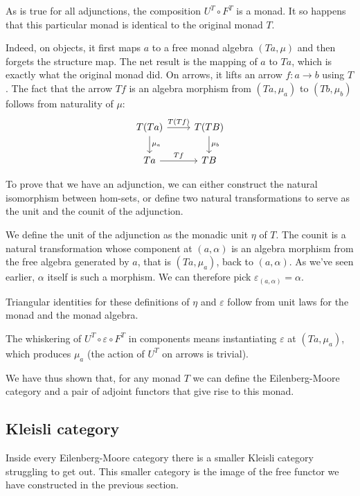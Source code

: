 \documentclass[DaoFP]{subfiles}
\begin{document}
As is true for all adjunctions, the composition $U^T \circ F^T$ is a monad. It so happens that this particular monad is identical to the original monad $T$. 

Indeed, on objects, it first maps $a$ to a free monad algebra $(T a, \mu)$ and then forgets the structure map. The net result is the mapping of $a$ to $T a$, which is exactly what the original monad did. On arrows, it lifts an arrow $f \colon a \to b$ using $T$. The fact that the arrow $T f$ is an algebra morphism from $(T a, \mu_a)$ to $(T b, \mu_b)$ follows from naturality of $\mu$:
\[
 \begin{tikzcd}
 T (T a)
 \arrow[r, "T( T f)"]
 \arrow[d, "\mu_a"]
 & T (T B)
\arrow[d, "\mu_b"]
 \\
 T a
 \arrow[r, "T f"]
 & T B
  \end{tikzcd}
\]



To prove that we have an adjunction, we can either construct the natural isomorphism between hom-sets, or define two natural transformations to serve as the unit and the counit of the adjunction. 

We define the unit of the adjunction as the monadic unit $\eta$ of $T$. The counit is a natural transformation whose component at $(a, \alpha)$ is an algebra morphism from the free algebra generated by $a$, that is $(T a, \mu_a)$, back to $(a, \alpha)$. As we've seen earlier, $\alpha$ itself is such a morphism. We can therefore pick $\varepsilon_{(a, \alpha)} = \alpha$.

Triangular identities for these definitions of $\eta$ and $\varepsilon$ follow from unit laws for the monad and the monad algebra.

The whiskering of $U^T \circ \varepsilon \circ F^T$ in components means instantiating $\varepsilon$ at $(T a, \mu_a)$, which produces $\mu_a$ (the action of $U^T$ on arrows is trivial). 

We have thus shown that, for any monad $T$ we can define the Eilenberg-Moore category and a pair of adjoint functors that give rise to this monad.

\subsection{Kleisli category}

Inside every Eilenberg-Moore category there is a smaller Kleisli category struggling to get out. This smaller category is the image of the free functor we have constructed in the previous section. 
\end{document}
